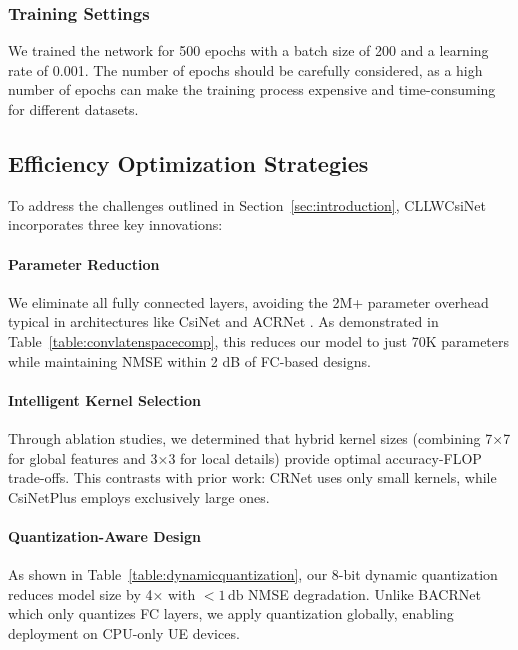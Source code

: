 \documentclass[lettersize,journal]{IEEEtran}
\begin{document}
\subsubsection{Training Settings}
We trained the network for 500 epochs with a batch size of 200 and a learning rate of 0.001. The number of epochs should be carefully considered, as a high number of epochs can make the training process expensive and time-consuming for different datasets.

\subsection{Efficiency Optimization Strategies} \label{subsec:efficiency}
To address the challenges outlined in Section~\ref{sec:introduction}, CLLWCsiNet incorporates three key innovations:

\paragraph{Parameter Reduction} 
We eliminate all fully connected layers, avoiding the 2M+ parameter overhead typical in architectures like CsiNet \cite{abe} and ACRNet \cite{abx}. As demonstrated in Table~\ref{table:convlatenspacecomp}, this reduces our model to just 70K parameters while maintaining NMSE within 2 dB of FC-based designs.

\paragraph{Intelligent Kernel Selection} 
Through ablation studies, we determined that hybrid kernel sizes (combining 7×7 for global features and 3×3 for local details) provide optimal accuracy-FLOP trade-offs. This contrasts with prior work: CRNet \cite{abn} uses only small kernels, while CsiNetPlus \cite{abo} employs exclusively large ones.

\paragraph{Quantization-Aware Design} 
As shown in Table~\ref{table:dynamicquantization}, our 8-bit dynamic quantization reduces model size by 4× with $< 1\,\text{db} $ NMSE degradation. Unlike BACRNet \cite{abx} which only quantizes FC layers, we apply quantization globally, enabling deployment on CPU-only UE devices.
\end{document}
